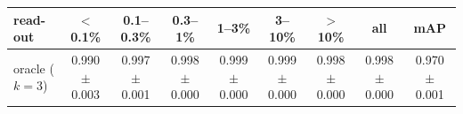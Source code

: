 \begin{tabular}{lcccccccc}
\toprule
read-out & $<$0.1\% & 0.1--0.3\% & 0.3--1\% & 1--3\% & 3--10\% & $>$10\% & all & mAP \\
\midrule
oracle ($k=3$) & 0.990 $\pm$ 0.003 & 0.997 $\pm$ 0.001 & 0.998 $\pm$ 0.000 & 0.999 $\pm$ 0.000 & 0.999 $\pm$ 0.000 & 0.998 $\pm$ 0.000 & 0.998 $\pm$ 0.000 & 0.970 $\pm$ 0.001 \\
\bottomrule
\end{tabular}
